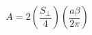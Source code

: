 \begin{equation}
A =2\left( \frac{S_\perp}{4}\right) \left(\frac{a\beta}{2\pi}\right) 
\label{actionvalue}
\end{equation}


